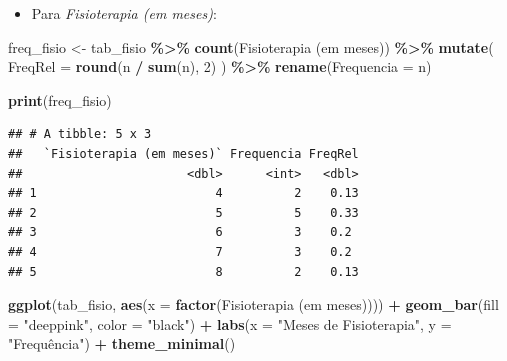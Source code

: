 \documentclass[
]{book}
\newenvironment{Shaded}{\begin{snugshade}}{\end{snugshade}}
\newcommand{\AttributeTok}[1]{\textcolor[rgb]{0.13,0.29,0.53}{#1}}
\newcommand{\DecValTok}[1]{\textcolor[rgb]{0.00,0.00,0.81}{#1}}
\newcommand{\FunctionTok}[1]{\textcolor[rgb]{0.13,0.29,0.53}{\textbf{#1}}}
\newcommand{\NormalTok}[1]{#1}
\newcommand{\OtherTok}[1]{\textcolor[rgb]{0.56,0.35,0.01}{#1}}
\newcommand{\SpecialCharTok}[1]{\textcolor[rgb]{0.81,0.36,0.00}{\textbf{#1}}}
\newcommand{\StringTok}[1]{\textcolor[rgb]{0.31,0.60,0.02}{#1}}
\providecommand{\tightlist}{%
  \setlength{\itemsep}{0pt}\setlength{\parskip}{0pt}}
\begin{document}
\begin{itemize}
\tightlist
\item
  Para \emph{Fisioterapia (em meses)}:
\end{itemize}

\begin{Shaded}
\begin{Highlighting}[]
\NormalTok{freq\_fisio }\OtherTok{\textless{}{-}}\NormalTok{ tab\_fisio }\SpecialCharTok{\%\textgreater{}\%}
  \FunctionTok{count}\NormalTok{(}\StringTok{\textasciigrave{}}\AttributeTok{Fisioterapia (em meses)}\StringTok{\textasciigrave{}}\NormalTok{) }\SpecialCharTok{\%\textgreater{}\%}
  \FunctionTok{mutate}\NormalTok{(}
    \AttributeTok{FreqRel =} \FunctionTok{round}\NormalTok{(n }\SpecialCharTok{/} \FunctionTok{sum}\NormalTok{(n), }\DecValTok{2}\NormalTok{)}
\NormalTok{  ) }\SpecialCharTok{\%\textgreater{}\%}
  \FunctionTok{rename}\NormalTok{(}\AttributeTok{Frequencia =}\NormalTok{ n)}

\FunctionTok{print}\NormalTok{(freq\_fisio)}
\end{Highlighting}
\end{Shaded}

\begin{verbatim}
## # A tibble: 5 x 3
##   `Fisioterapia (em meses)` Frequencia FreqRel
##                       <dbl>      <int>   <dbl>
## 1                         4          2    0.13
## 2                         5          5    0.33
## 3                         6          3    0.2 
## 4                         7          3    0.2 
## 5                         8          2    0.13
\end{verbatim}

\begin{Shaded}
\begin{Highlighting}[]
\FunctionTok{ggplot}\NormalTok{(tab\_fisio, }\FunctionTok{aes}\NormalTok{(}\AttributeTok{x =} \FunctionTok{factor}\NormalTok{(}\StringTok{\textasciigrave{}}\AttributeTok{Fisioterapia (em meses)}\StringTok{\textasciigrave{}}\NormalTok{))) }\SpecialCharTok{+}
  \FunctionTok{geom\_bar}\NormalTok{(}\AttributeTok{fill =} \StringTok{"deeppink"}\NormalTok{, }\AttributeTok{color =} \StringTok{"black"}\NormalTok{) }\SpecialCharTok{+}
  \FunctionTok{labs}\NormalTok{(}\AttributeTok{x =} \StringTok{"Meses de Fisioterapia"}\NormalTok{, }\AttributeTok{y =} \StringTok{"Frequência"}\NormalTok{) }\SpecialCharTok{+}
  \FunctionTok{theme\_minimal}\NormalTok{()}
\end{Highlighting}
\end{Shaded}
\end{document}
